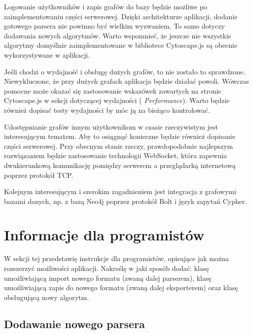 Logowanie użytkowników i zapis grafów do bazy będzie możliwe po zaimplementowaniu części serwerowej. Dzięki architekturze aplikacji, dodanie gotowego parsera nie powinno być wielkim wyzwaniem. To samo dotyczy dodawania nowych algorytmów. Warto wspomnieć, że jeszcze nie wszystkie algorytmy domyślnie zaimplementowane w bibliotece Cytoscape.js są obecnie wykorzystywane w aplikacji.

Jeśli chodzi o wydajność i obsługę dużych grafów, to nie zostało to sprawdzone. Niewykluczone, że przy dużych grafach aplikacja będzie działać powoli. Wówczas pomocne może okazać się zastosowanie wskazówek zawartych na stronie Cytoscape.js w sekcji dotyczącej wydajności (\cite{cytoscape} \textit{Performance}). Warto będzie również dopisać testy wydajności by móc ją na bieżąco kontrolować. 

Udostępnianie grafów innym użytkownikom w czasie rzeczywistym jest interesującym tematem. Aby to osiągnąć konieczne będzie również dopisanie części serwerowej. Przy obecnym stanie rzeczy, prawdopodobnie najlepszym rozwiązaniem będzie zastosowanie technologii WebSocket, która zapewnia dwukierunkową komunikację pomiędzy serwerem a przeglądarką internetową poprzez protokół TCP. 

Kolejnym interesującym i szerokim zagadnieniem jest integracja z grafowymi bazami danych, np. z bazą Neo4j poprzez protokół Bolt i język zapytań Cypher.

\bigskip

\section{Informacje dla programistów}

W sekcji tej przedstawię instrukcje dla programistów, opisujące jak można rozszerzyć możliwości aplikacji. Nakreślę w jaki sposób dodać: klasę umożliwiającą import nowego formatu (zwaną dalej parserem), klasę umożliwiającą zapis do nowego formatu (zwaną dalej eksporterem) oraz klasę obsługującą nowy algorytm.

\bigskip

\subsection*{Dodawanie nowego parsera}

